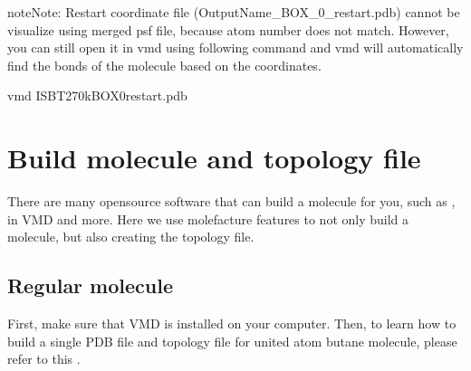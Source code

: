 \documentclass[letterpaper,10pt,english]{sphinxmanual}
\begin{document}
\begin{sphinxadmonition}{note}{Note:}
\sphinxAtStartPar
Restart coordinate file (OutputName\_BOX\_0\_restart.pdb) cannot be visualize using merged psf file, because atom number does not match. However, you can still open it in vmd using following command and vmd will automatically find the bonds of the molecule based on the coordinates.
\end{sphinxadmonition}

\begin{sphinxVerbatim}[commandchars=\\\{\}]
\PYGZdl{} vmd   ISB\PYGZus{}T\PYGZus{}270\PYGZus{}k\PYGZus{}BOX\PYGZus{}0\PYGZus{}restart.pdb
\end{sphinxVerbatim}


\section{Build molecule and topology file}
\label{\detokenize{howto:build-molecule-and-topology-file}}
\sphinxAtStartPar
There are many open\sphinxhyphen{}source software that can build a molecule for you, such as  ,
 in VMD and more. Here we use molefacture features to not only build a molecule,
but also creating the topology file.


\subsection{Regular molecule}
\label{\detokenize{howto:regular-molecule}}
\sphinxAtStartPar
First, make sure that VMD is installed on your computer. Then, to learn how to build a single PDB file and topology file for united atom butane molecule,
please refer to this  .
\end{document}
